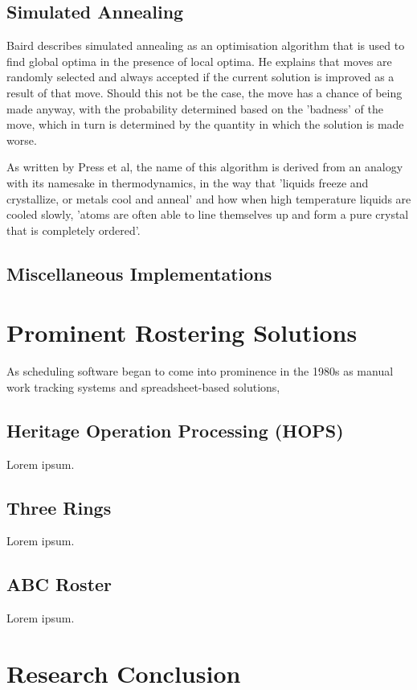 
\subsection{Simulated Annealing}
Baird describes simulated annealing as an optimisation algorithm that is used to find global optima in the presence of local optima. He explains that moves are randomly selected and always accepted if the current solution is improved as a result of that move. Should this not be the case, the move has a chance of being made anyway, with the probability determined based on the 'badness' of the move, which in turn is determined by the quantity in which the solution is made worse. \cite{Baird1998}

As written by Press et al, the name of this algorithm is derived from an analogy with its namesake in thermodynamics, in the way that 'liquids freeze and crystallize, or metals cool and anneal' and how when high temperature liquids are cooled slowly, 'atoms are often able to line themselves up and form a pure crystal that is completely ordered'. \cite{Press:1992:NRC:148286}



\subsection{Miscellaneous Implementations}


\section{Prominent Rostering Solutions}

As scheduling software began to come into prominence in the 1980s as manual work tracking systems and spreadsheet-based solutions, 

\subsection{Heritage Operation Processing (HOPS)}

Lorem ipsum.

\subsection{Three Rings}

Lorem ipsum.

\subsection{ABC Roster}

Lorem ipsum.

\section{Research Conclusion}
